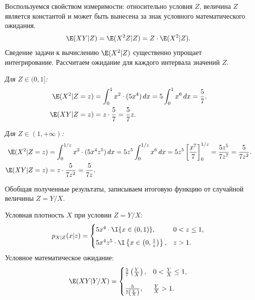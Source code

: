 \begin{Solution}
    Воспользуемся свойством измеримости: относительно условия $Z$, величина $Z$ является константой и может быть вынесена за знак условного математического ожидания.
    \[
        \E(XY | Z) = \E(X^2Z | Z) = Z \cdot \E(X^2 | Z).
    \]
    Сведение задачи к вычислению $\E(X^2 | Z)$ существенно упрощает интегрирование. Рассчитаем ожидание для каждого интервала значений $Z$.

    \textit{Для $Z \in (0, 1]$:}
    \begin{align*}
        \E(X^2 | Z=z) &= \int_{0}^{1} x^2 \cdot (5x^4) \, dx = 5 \int_{0}^{1} x^6 \, dx = \frac{5}{7}. \\
        \E(XY | Z=z) &= z \cdot \frac{5}{7} = \frac{5}{7}z.
    \end{align*}

    \textit{Для $Z \in (1, +\infty)$:}
    \begin{align*}
        \E(X^2 | Z=z) &= \int_{0}^{1/z} x^2 \cdot (5x^4z^5) \, dx = 5z^5 \int_{0}^{1/z} x^6 \, dx = 5z^5 \left[ \frac{x^7}{7} \right]_0^{1/z} = \frac{5z^5}{7z^7} = \frac{5}{7z^2}. \\
        \E(XY | Z=z) &= z \cdot \frac{5}{7z^2} = \frac{5}{7z}.
    \end{align*}

    Обобщая полученные результаты, записываем итоговую функцию от случайной величины $Z = Y/X$.
\end{Solution}

\begin{Answer}
    Условная плотность $X$ при условии $Z = Y/X$:
    \[
        p_{X|Z}(x|z) = \begin{cases}
            5x^4 \cdot \I\{x \in (0, 1)\}, & 0 < z \le 1, \\[0.5em]
            5x^4z^5 \cdot \I\left\{x \in \left(0, \frac{1}{z}\right)\right\}, & z > 1.
        \end{cases}
    \]
    Условное математическое ожидание:
    \[
        \E(XY | Y/X) = \begin{cases}
            \frac{5}{7}\left(\frac{Y}{X}\right), & 0 < \frac{Y}{X} \le 1, \\[1em]
            \frac{5}{7\left(\frac{Y}{X}\right)}, & \frac{Y}{X} > 1.
        \end{cases}
    \]
\end{Answer}
